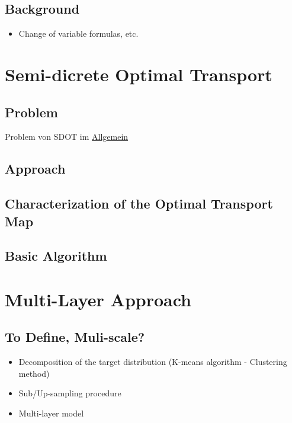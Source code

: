 \documentclass[
     12pt,         %
     a4paper,      %
     BCOR=10mm,     %
     DIV=14,        %
     ]{scrreprt}
\begin{document}
\section{Background}
\begin{itemize}
    \item Change of variable formulas, etc.
\end{itemize}


\chapter{Semi-dicrete Optimal Transport}\label{Optimal Transport}

\section{Problem}
Problem von SDOT im \uline{Allgemein}

\section{Approach}

\newpage
\section{Characterization of the Optimal Transport Map}


\newpage
\section{Basic Algorithm}


\chapter{Multi-Layer Approach}

\section{To Define, Muli-scale?}
\begin{itemize}
    \item Decomposition of the target distribution (K-means algorithm - Clustering method)
    \item Sub/Up-sampling procedure
    \item Multi-layer model
\end{itemize}
\end{document}
